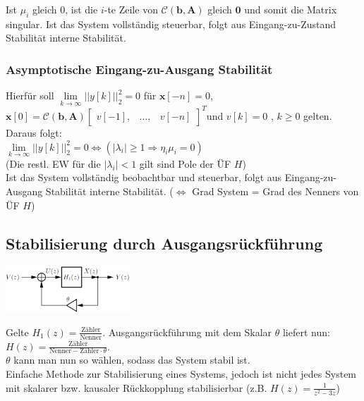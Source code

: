 \documentclass[a4paper,landscape,6pt]{article}
\newcommand{\ma}[1]{\ensuremath{\boldsymbol {#1}}}								%
\newcommand{\mat}[1]{\ensuremath{\begin{bmatrix} #1 \end{bmatrix}}}				%
\renewcommand{\vec}[1]{\ensuremath{\boldsymbol {#1}}}							%
\begin{document}
\begin{multicols}{3}
Ist $\mu_i$ gleich 0, ist die $i$-te Zeile von $\ma{\mathcal{C}}(\vec b, \ma A)$ gleich $\vec 0$ und somit die Matrix singular.
Ist das System vollständig steuerbar, folgt aus Eingang-zu-Zustand Stabilität interne Stabilität.
\subsubsection*{Asymptotische Eingang-zu-Ausgang Stabilität}
Hierfür soll $\lim\limits_{k \rightarrow \infty} ||y[k]||_2^2 = 0$ für $\vec x[-n]=0$, $\vec x[0] = \ma{\mathcal{C}}(\vec b, \ma A) \mat{v[-1], & \dots ,& v[-n]}^T$und $v[k] = 0$ , $k\ge 0$ gelten. Daraus folgt:\\

\tab $\boxed{\lim\limits_{k \rightarrow \infty} ||y[k]||_2^2 = 0 \Leftrightarrow (|\lambda_i| \ge 1 \Rightarrow \eta_i \mu_i = 0)}$\\
(Die restl. EW für die $|\lambda_i| < 1$ gilt sind Pole der ÜF $H$)\\

Ist das System vollständig beobachtbar und steuerbar, folgt aus Eingang-zu-Ausgang Stabilität interne Stabilität. ($\Leftrightarrow$ Grad System = Grad des Nenners von ÜF $H$)
\subsection*{Stabilisierung durch Ausgangsrückführung}
	\begin{minipage}[t]{0.5\textwidth}
		\hspace{1 cm}
		\includegraphics[width=0.35\textwidth]{images_ssp/Outputfeedback}\\
	\end{minipage}

Gelte $H_1(z) = \frac{\text{Zähler}}{\text{Nenner}}$. Ausgangsrückführung mit dem Skalar $\theta$ liefert nun: $H(z)=\frac{\text{Zähler}}{\text{Nenner} - \text{Zähler}\cdot\theta}$.\\
$\theta$ kann man nun so wählen, sodass das System stabil ist.\\
Einfache Methode zur Stabilisierung eines Systems, jedoch ist nicht jedes System mit skalarer bzw. kausaler Rückkopplung stabilisierbar (z.B. $H(z) = \frac{1}{z^2-3z}$)


\end{multicols}
\end{document}
